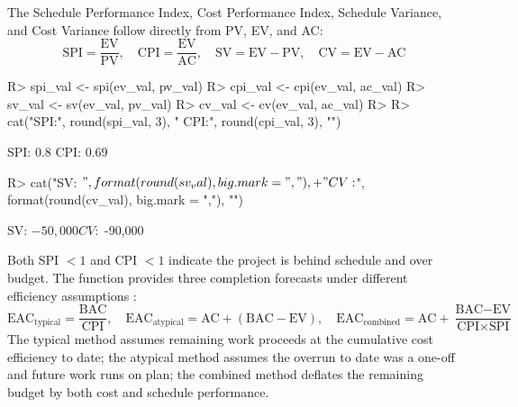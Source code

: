 \documentclass[
]{jss}
\begin{document}
The Schedule Performance Index, Cost Performance Index, Schedule
Variance, and Cost Variance follow directly from PV, EV, and AC:
\[\text{SPI} = \frac{\text{EV}}{\text{PV}}, \quad
  \text{CPI} = \frac{\text{EV}}{\text{AC}}, \quad
  \text{SV} = \text{EV} - \text{PV}, \quad
  \text{CV} = \text{EV} - \text{AC}\]

\begin{CodeChunk}
\begin{CodeInput}
R> spi_val  <- spi(ev_val, pv_val)
R> cpi_val  <- cpi(ev_val, ac_val)
R> sv_val   <- sv(ev_val,  pv_val)
R> cv_val   <- cv(ev_val,  ac_val)
R> 
R> cat("SPI:", round(spi_val, 3), "  CPI:", round(cpi_val, 3), "\n")
\end{CodeInput}
\begin{CodeOutput}
SPI: 0.8   CPI: 0.69 
\end{CodeOutput}
\begin{CodeInput}
R> cat("SV: $", format(round(sv_val), big.mark = ","),
+     "  CV: $", format(round(cv_val), big.mark = ","), "\n")
\end{CodeInput}
\begin{CodeOutput}
SV: $ -50,000   CV: $ -90,000 
\end{CodeOutput}
\end{CodeChunk}

Both SPI \(< 1\) and CPI \(< 1\) indicate the project is behind schedule
and over budget. The  function provides three completion
forecasts under different efficiency assumptions \citep{Fleming2010}:
\[\text{EAC}_{\text{typical}} = \frac{\text{BAC}}{\text{CPI}}, \quad
  \text{EAC}_{\text{atypical}} = \text{AC} + (\text{BAC} - \text{EV}), \quad
  \text{EAC}_{\text{combined}} = \text{AC} +
  \frac{\text{BAC} - \text{EV}}{\text{CPI} \times \text{SPI}}\] The
typical method assumes remaining work proceeds at the cumulative cost
efficiency to date; the atypical method assumes the overrun to date was
a one-off and future work runs on plan; the combined method deflates the
remaining budget by both cost and schedule performance.
\end{document}

